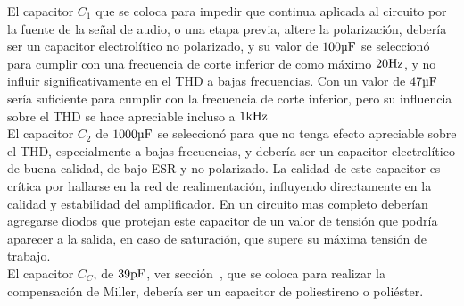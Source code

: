 
El capacitor $C_{1}$ que se coloca para impedir que continua aplicada al circuito por la fuente de la señal de audio, o una etapa previa, altere la polarización, debería ser un capacitor electrolítico no polarizado, y su valor de $100 \si[per-mode=symbol]{\micro\farad}$ se seleccionó para cumplir con una frecuencia de corte inferior de como máximo $20 \si[per-mode=symbol]{\hertz}$, y no influir significativamente en el THD a bajas frecuencias. Con un valor de $47 \si[per-mode=symbol]{\micro\farad}$ sería suficiente para cumplir con la frecuencia de corte inferior, pero su influencia sobre el THD se hace apreciable incluso a $1 \si[per-mode=symbol]{\kilo\hertz}$ \\

El capacitor $C_{2}$ de $1000 \si[per-mode=symbol]{\micro\farad}$ se seleccionó para que no tenga efecto apreciable sobre el THD, especialmente a bajas frecuencias, y debería ser un capacitor electrolítico de buena calidad, de bajo ESR y no polarizado. La calidad de este capacitor es crítica por hallarse en la red de realimentación, influyendo directamente en la calidad y estabilidad del amplificador. En un circuito mas completo deberían agregarse diodos que protejan este capacitor de un valor de tensión que podría aparecer a la salida, en caso de saturación, que supere su máxima tensión de trabajo. \\

El capacitor $C_{C}$, de $39 \si[per-mode=symbol]{\pico\farad}$, ver sección~, que se coloca para realizar la compensación de Miller, debería ser un capacitor de poliestireno o poliéster.


\vfill



